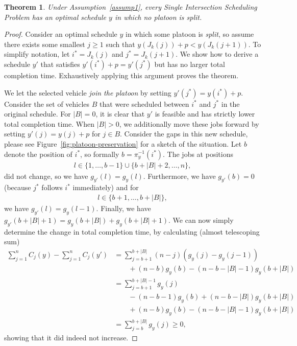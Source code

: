 \documentclass{article}
\theoremstyle{definition}
\theoremstyle{plain}
\newtheorem{theorem}{Theorem}[section]
\begin{document}
\begin{theorem}
  \label{prop:platoon-preservation}
  Under Assumption~\ref{assump1}, every Single Intersection Scheduling Problem has an
  optimal schedule $y$ in which no platoon is split.
\end{theorem}
\begin{proof}
  Consider an optimal schedule $y$ in which some platoon is \textit{split}, so
  assume there exists some smallest $j \geq 1$ such that
  $y(J_{k}(j)) + p < y(J_{k}(j+1)) $. To simplify notation, let $i^{*}=J_{k}(j)$
  and $j^{*}=J_{k}(j+1)$. We show how to derive a schedule $y'$ that satisfies
  $y'(i^{*}) + p = y'(j^{*})$ but has no larger total completion time. Exhaustively
  applying this argument proves the theorem.

  We let the selected vehicle \textit{join the platoon} by setting
  $y'(j^{*}) = y(i^{*}) + p$. Consider the set of vehicles $B$ that were
  scheduled between $i^{*}$ and $j^{*}$ in the original schedule. For $|B| = 0$,
  it is clear that $y'$ is feasible and has strictly lower total completion
  time. When $|B| > 0$, we additionally move these jobs forward by setting
  $y'(j) = y(j) + p$ for $j \in B$.
  Consider the gaps in this new schedule, please see Figure~\ref{fig:platoon-preservation} for a sketch of the situation.
  Let $b$ denote the position of $i^{*}$, so formally $b = \pi_{y}^{-1}(i^{*})$.
  The jobs at positions
  \begin{align*}
    l\in\{1,\dots, b-1\} \cup \{b + |B| + 2, \dots, n\} ,
  \end{align*}
  did not change, so we have $g_{y'}(l) = g_{y}(l)$.
  Furthermore, we have $g_{y'}(b) = 0$ (because $j^{*}$ follows $i^{*}$ immediately) and for
  \begin{align*}
    l \in \{b+1, \dots, b+|B|\} ,
  \end{align*}
  we have $g_{y'}(l) = g_{y}(l-1)$. Finally, we have
  $g_{y'}(b+|B|+1) = g_{y}(b+|B|) + g_{y}(b+|B|+1)$. We can now simply determine
  the change in total completion time, by calculating (almost telescoping sum)
  \begin{align*}
    \sum_{j=1}^{n} C_{j}(y) - \sum_{j=1}^{n} C_{j}(y') &= \sum_{j=b+1}^{b+|B|} (n-j) (g_{y}(j) - g_{y}(j-1)) \\
    &\quad \quad + (n-b) g_{y}(b) - (n-b-|B|-1) g_{y}(b+|B|) \\
    &= \sum_{j=b+1}^{b+|B|-1} g_{y}(j) \\
    &\quad \quad - (n-b-1)g_{y}(b) + (n-b-|B|) g_{y}(b+|B|) \\
    &\quad \quad + (n-b) g_{y}(b) - (n-b-|B|-1) g_{y}(b+|B|) \\
    &= \sum_{j=b}^{b+|B|} g_{y}(j) \geq 0 ,
  \end{align*}
  showing that it did indeed not increase.
\end{proof}
\end{document}
